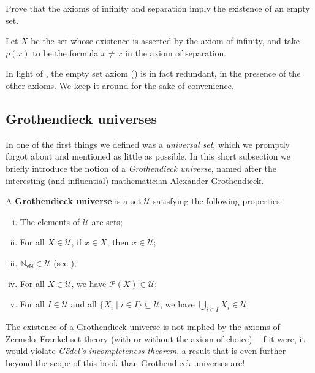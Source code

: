 \begin{exercise}
\label{exEmptySetFromInfinityAndSeparation}
Prove that the axioms of infinity and separation imply the existence of an empty set.
\begin{backhint}
Let $X$ be the set whose existence is asserted by the axiom of infinity, and take $p(x)$ to be the formula $x \ne x$ in the axiom of separation.
\end{backhint}
\end{exercise}

In light of , the empty set axiom () is in fact redundant, in the presence of the other axioms. We keep it around for the sake of convenience.



\subsection*{Grothendieck universes}
\label{subsecGrothendieckUniverses}

In  one of the first things we defined was a \textit{universal set}, which we promptly forgot about and mentioned as little as possible. In this short subsection we briefly introduce the notion of a \textit{Grothendieck universe}, named after the interesting (and influential) mathematician Alexander Grothendieck.

\begin{definition}
\label{defGrothendieckUniverse}
A \textbf{Grothendieck universe} is a set $\mathcal{U}$ satisfying the following properties:
\begin{enumerate}[(i)]
\item The elements of $\mathcal{U}$ are sets;
\item For all $X \in \mathcal{U}$, if $x \in X$, then $x \in \mathcal{U}$;
\item $\mathbb{N}_{\mathsf{vN}} \in \mathcal{U}$ (see );
\item For all $X \in \mathcal{U}$, we have $\mathcal{P}(X) \in \mathcal{U}$;
\item For all $I \in \mathcal{U}$ and all $\{ X_i \mid i \in I \} \subseteq \mathcal{U}$, we have $\bigcup_{i \in I} X_i \in \mathcal{U}$.
\end{enumerate}
\end{definition}

The existence of a Grothendieck universe is not implied by the axioms of Zermelo--Frankel set theory (with or without the axiom of choice)---if it were, it would violate \textit{G\"{o}del's incompleteness theorem}, a result that is even further beyond the scope of this book than Grothendieck universes are!

